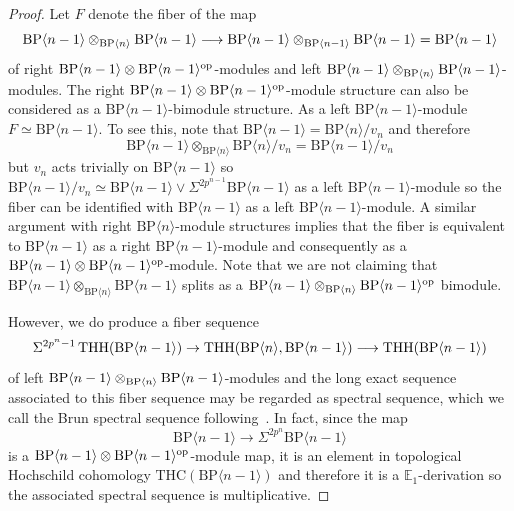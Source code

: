\begin{proof}
Let $F$ denote the fiber of the map 
\[ 
\mathrm{BP}\langle n-1\rangle\otimes_{\mathrm{BP}\langle n\rangle}\mathrm{BP}\langle n-1\rangle \longrightarrow \mathrm{BP}\langle n-1\rangle \otimes_{\mathrm{BP}\langle n-1\rangle}\mathrm{BP}\langle n-1\rangle =\mathrm{BP}\langle n-1\rangle 
\]
of right $\mathrm{BP}\langle n-1\rangle \otimes \mathrm{BP}\langle n-1\rangle^{\mathrm{op}}$-modules and left $\mathrm{BP}\langle n-1\rangle\otimes_{\mathrm{BP}\langle n\rangle}\mathrm{BP}\langle n-1\rangle$-modules. The right $\mathrm{BP}\langle n-1\rangle \otimes \mathrm{BP}\langle n-1\rangle^{\mathrm{op}}$-module structure can also be considered as a $\mathrm{BP}\langle n-1\rangle$-bimodule structure. As a left $\mathrm{BP}\langle n-1\rangle$-module $F\simeq \mathrm{BP}\langle n-1\rangle$. To see this, note that $\mathrm{BP}\langle n-1 \rangle=\mathrm{BP}\langle n\rangle/v_n$ and therefore 
\[ \mathrm{BP}\langle n-1 \rangle\otimes_{\mathrm{BP}\langle n\rangle} \mathrm{BP}\langle n\rangle/v_n=\mathrm{BP}\langle n-1 \rangle/v_n\]
but $v_n$ acts trivially on $\mathrm{BP}\langle n-1 \rangle$ so $\mathrm{BP}\langle n-1 \rangle/v_n\simeq \mathrm{BP}\langle n-1 \rangle\vee \Sigma^{2p^{n-1}}\mathrm{BP}\langle n-1 \rangle$ as a left $\mathrm{BP}\langle n-1 \rangle$-module so the fiber can be identified with $\mathrm{BP}\langle n-1 \rangle$ as a left $\mathrm{BP}\langle n-1 \rangle$-module. A similar argument with right 
$\mathrm{BP}\langle n\rangle$-module structures implies that the fiber is equivalent to $\mathrm{BP}\langle n-1\rangle$ as a right $\mathrm{BP}\langle n-1\rangle$-module and consequently as a $\mathrm{BP}\langle n-1\rangle\otimes \mathrm{BP}\langle n-1\rangle^{\mathrm{op}}$-module. Note that we are not claiming that $\mathrm{BP}\langle n-1\rangle \otimes_{\mathrm{BP}\langle n\rangle}\mathrm{BP}\langle n-1\rangle$ splits as a $\mathrm{BP}\langle n-1\rangle \otimes_{\mathrm{BP}\langle n\rangle}\mathrm{BP}\langle n-1\rangle^{\mathrm{op}}$ bimodule. 

However, we do produce a fiber sequence 
\[ 
\Sigma^{2p^{n}-1}\operatorname{THH}(\mathrm{BP}\langle n-1 \rangle)\to  \operatorname{THH}( \mathrm{BP}\langle n \rangle,\mathrm{BP}\langle n-1 \rangle)\longrightarrow \operatorname{THH}(\mathrm{BP}\langle n-1 \rangle)
\]
of left $\mathrm{BP}\langle n-1\rangle \otimes_{\mathrm{BP}\langle n \rangle }\mathrm{BP}\langle n-1\rangle $-modules 
and the long exact sequence associated to this fiber sequence may be regarded as spectral sequence, which we call the Brun spectral sequence following~\cite{Hon20}. In fact, since the map 
\[ \mathrm{BP}\langle n-1\rangle \to \Sigma^{2p^{n}}\mathrm{BP}\langle n-1\rangle 
\]
is a $\mathrm{BP}\langle n-1\rangle \otimes \mathrm{BP}\langle n-1\rangle^{\mathrm{op}}$-module map, it is an element in topological Hochschild cohomology $\mathrm{THC}(\mathrm{BP}\langle n-1\rangle)$ and therefore it is a $\mathbb{E}_1$-derivation so the associated spectral sequence is multiplicative. 
\end{proof}


